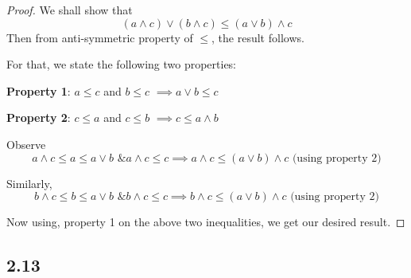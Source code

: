 \documentclass[12pt]{article}
\begin{document}
\begin{proof}
We shall show that 
$$(a \wedge c) \vee (b \wedge c) \leq (a \vee b) \wedge c$$ 
Then from anti-symmetric property of $\leq$, the result follows.

For that, we state the following two properties:

\textbf{Property 1}: $a \leq c$ and $b \leq c$ $\implies a \vee b \leq c$

\textbf{Property 2}: $c \leq a$ and $c \leq b$ $\implies c \leq a \wedge b$

Observe 
$$a \wedge c \leq a \leq a \vee b \text{ \& } a \wedge c \leq c \implies a \wedge c \leq (a \vee b) \wedge c \text{ (using property 2)}$$

Similarly,
$$b \wedge c \leq b \leq a \vee b \text{ \& } b \wedge c \leq c \implies b \wedge c \leq (a \vee b) \wedge c \text{ (using property 2)}$$

Now using, property 1 on the above two inequalities, we get our desired result.

\end{proof}

\subsection*{2.13}
\end{document}
